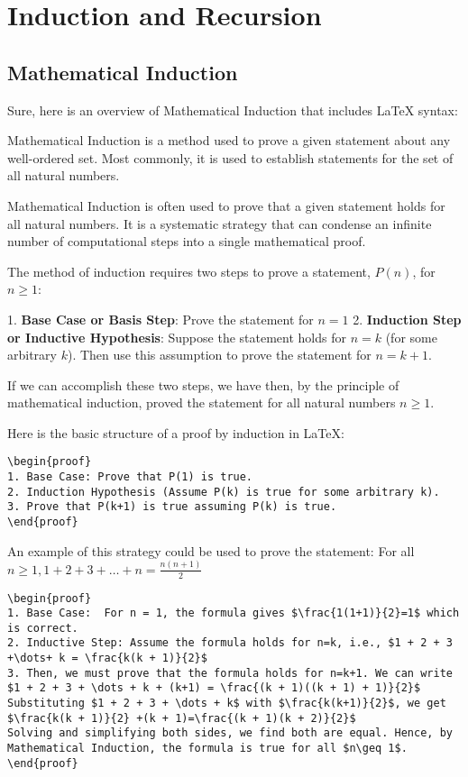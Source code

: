 \section{Induction and Recursion}
\subsection{Mathematical Induction}
Sure, here is an overview of Mathematical Induction that includes LaTeX syntax:

Mathematical Induction is a method used to prove a given statement about any well-ordered set. Most commonly, it is used to establish statements for the set of all natural numbers.

Mathematical Induction is often used to prove that a given statement holds for all natural numbers. It is a systematic strategy that can condense an infinite number of computational steps into a single mathematical proof.

The method of induction requires two steps to prove a statement, $P(n)$, for $n\geq 1$:

1. \textbf{Base Case or Basis Step}: Prove the statement for $n=1$
2. \textbf{Induction Step or Inductive Hypothesis}: Suppose the statement holds for $n=k$ (for some arbitrary $k$). Then use this assumption to prove the statement for $n=k+1$.

If we can accomplish these two steps, we have then, by the principle of mathematical induction, proved the statement for all natural numbers $n\geq 1$.

Here is the basic structure of a proof by induction in LaTeX:

\begin{verbatim}
\begin{proof}
1. Base Case: Prove that P(1) is true.
2. Induction Hypothesis (Assume P(k) is true for some arbitrary k).
3. Prove that P(k+1) is true assuming P(k) is true.
\end{proof}
\end{verbatim}

An example of this strategy could be used to prove the statement: For all $n \geq 1, 1 + 2 + 3 + \dots + n = \frac{n(n+1)}{2}$

\begin{verbatim}
\begin{proof}
1. Base Case:  For n = 1, the formula gives $\frac{1(1+1)}{2}=1$ which is correct.
2. Inductive Step: Assume the formula holds for n=k, i.e., $1 + 2 + 3 +\dots+ k = \frac{k(k + 1)}{2}$
3. Then, we must prove that the formula holds for n=k+1. We can write $1 + 2 + 3 + \dots + k + (k+1) = \frac{(k + 1)((k + 1) + 1)}{2}$
Substituting $1 + 2 + 3 + \dots + k$ with $\frac{k(k+1)}{2}$, we get $\frac{k(k + 1)}{2} +(k + 1)=\frac{(k + 1)(k + 2)}{2}$
Solving and simplifying both sides, we find both are equal. Hence, by Mathematical Induction, the formula is true for all $n\geq 1$.
\end{proof}
\end{verbatim}

